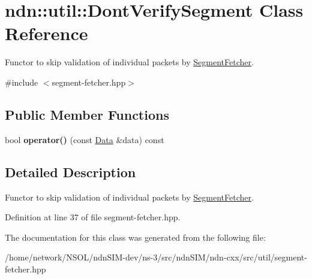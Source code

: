 \hypertarget{classndn_1_1util_1_1DontVerifySegment}{}\section{ndn\+:\+:util\+:\+:Dont\+Verify\+Segment Class Reference}
\label{classndn_1_1util_1_1DontVerifySegment}


Functor to skip validation of individual packets by \hyperlink{classndn_1_1util_1_1SegmentFetcher}{Segment\+Fetcher}.  




{\ttfamily \#include $<$segment-\/fetcher.\+hpp$>$}

\subsection*{Public Member Functions}
\begin{DoxyCompactItemize}
\item 
bool {\bfseries operator()} (const \hyperlink{classndn_1_1Data}{Data} \&data) const\hypertarget{classndn_1_1util_1_1DontVerifySegment_aa8cb580e163a967d999567f8c18eb6af}{}\label{classndn_1_1util_1_1DontVerifySegment_aa8cb580e163a967d999567f8c18eb6af}

\end{DoxyCompactItemize}


\subsection{Detailed Description}
Functor to skip validation of individual packets by \hyperlink{classndn_1_1util_1_1SegmentFetcher}{Segment\+Fetcher}. 

Definition at line 37 of file segment-\/fetcher.\+hpp.



The documentation for this class was generated from the following file\+:\begin{DoxyCompactItemize}
\item 
/home/network/\+N\+S\+O\+L/ndn\+S\+I\+M-\/dev/ns-\/3/src/ndn\+S\+I\+M/ndn-\/cxx/src/util/segment-\/fetcher.\+hpp\end{DoxyCompactItemize}
